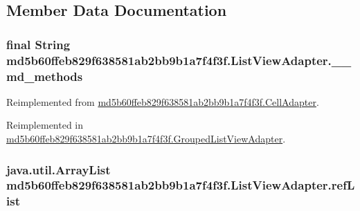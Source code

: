 \subsection{Member Data Documentation}
\hypertarget{classmd5b60ffeb829f638581ab2bb9b1a7f4f3f_1_1_list_view_adapter_3484b09d18c193e3a6efbf9abd22592a}{
\subsubsection[{\_\-\_\-md\_\-methods}]{\setlength{\rightskip}{0pt plus 5cm}final String {\bf md5b60ffeb829f638581ab2bb9b1a7f4f3f.ListViewAdapter.\_\-\_\-md\_\-methods}}}
\label{classmd5b60ffeb829f638581ab2bb9b1a7f4f3f_1_1_list_view_adapter_3484b09d18c193e3a6efbf9abd22592a}




Reimplemented from \hyperlink{classmd5b60ffeb829f638581ab2bb9b1a7f4f3f_1_1_cell_adapter_be33e45a7b887b1383f9c0ebda43ef00}{md5b60ffeb829f638581ab2bb9b1a7f4f3f.CellAdapter}.

Reimplemented in \hyperlink{classmd5b60ffeb829f638581ab2bb9b1a7f4f3f_1_1_grouped_list_view_adapter_e887eb8c51f6679bbffdba979210ff48}{md5b60ffeb829f638581ab2bb9b1a7f4f3f.GroupedListViewAdapter}.\hypertarget{classmd5b60ffeb829f638581ab2bb9b1a7f4f3f_1_1_list_view_adapter_2b206b389692997413bd835dceb3d7ec}{
\subsubsection[{refList}]{\setlength{\rightskip}{0pt plus 5cm}java.util.ArrayList {\bf md5b60ffeb829f638581ab2bb9b1a7f4f3f.ListViewAdapter.refList}}}
\label{classmd5b60ffeb829f638581ab2bb9b1a7f4f3f_1_1_list_view_adapter_2b206b389692997413bd835dceb3d7ec}




